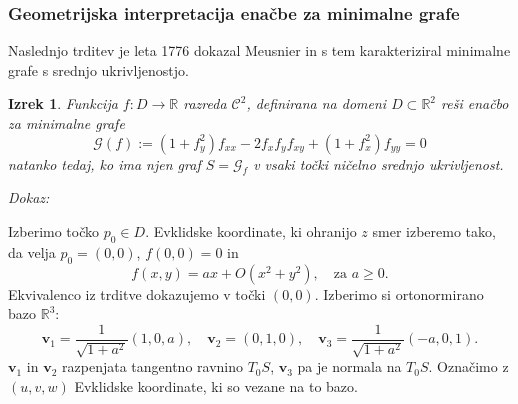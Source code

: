\documentclass[8pt]{beamer}
\theoremstyle{definition}
\theoremstyle{remark}
\theoremstyle{plain}
\newtheorem{izrek}[definicija]{Izrek}
\numberwithin{equation}{section}  %
\begin{document}
\begin{frame}
    \frametitle{Geometrijska interpretacija enačbe za minimalne grafe}

    Naslednjo trditev je leta 1776 dokazal Meusnier in s tem karakteriziral minimalne grafe s srednjo ukrivljenostjo. 
    \begin{izrek}
        Funkcija $f: D \rightarrow \mathbb{R}$ razreda $\mathscr{C}^2$, definirana na domeni $D \subset \mathbb{R}^2$ reši enačbo za minimalne grafe 
        \begin{equation*}
            \mathscr{G}(f):=\left(1+f_y^2\right) f_{x x}-2 f_x f_y f_{x y}+\left(1+f_x^2\right) f_{y y}=0 
        \end{equation*}
        natanko tedaj, ko ima njen graf $S=\mathcal{G}_f$ v vsaki točki  ničelno srednjo ukrivljenost. 
    \end{izrek}
    \pause
    \emph{Dokaz:}

    Izberimo točko $p_0\in D$. Evklidske koordinate, ki ohranijo $z$ smer izberemo tako, da velja $p_0=(0,0)$, $f(0,0)=0$ in 
    \begin{equation*}
        f(x, y)=a x+O\left(x^2+y^2\right), \quad \text{za }  a \geq 0.    
    \end{equation*}
    \pause 
    Ekvivalenco iz trditve dokazujemo v točki $(0,0)$. Izberimo si ortonormirano bazo $\mathbb{R}^3$:
    \begin{equation*}
        \mathbf{v}_1=\frac{1}{\sqrt{1+a^2}}(1,0, a), \quad \mathbf{v}_2=(0,1,0), \quad \mathbf{v}_3=\frac{1}{\sqrt{1+a^2}}(-a, 0,1).
    \end{equation*}
    $\mathbf{v}_1$ in $\mathbf{v}_2$ razpenjata tangentno ravnino $T_0 S$, $\mathbf{v}_3$ pa je normala na $T_0S$. Označimo z $(u, v, w)$ Evklidske koordinate, ki so vezane na to bazo. 
     
\end{frame}
\end{document}
